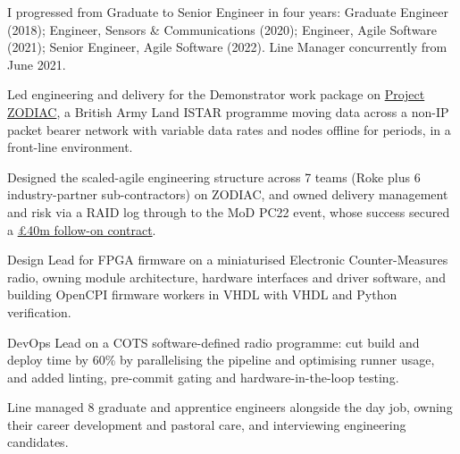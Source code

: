 I progressed from Graduate to Senior Engineer in four years: Graduate Engineer (2018); Engineer, Sensors \& Communications (2020); Engineer, Agile Software (2021); Senior Engineer, Agile Software (2022). \newline %
Line Manager concurrently from June 2021.
\vspace{0.25em}
\iftechnical%
\begin{tightemize}
  \item Led engineering and delivery for the Demonstrator work package on \href{https://www.roke.co.uk/project-zodiac/}{Project ZODIAC}, a British Army Land ISTAR programme moving data across a non-IP packet bearer network with variable data rates and nodes offline for periods, in a front-line environment.
  \item Designed the scaled-agile engineering structure across 7 teams (Roke plus 6 industry-partner sub-contractors) on ZODIAC, and owned delivery management and risk via a RAID log through to the MoD PC22 event, whose success secured a \href{https://www.linkedin.com/posts/roke-manor-research_roke-weareroke-activity-7108015849168347139-bJ8Z/}{\pounds{}40m follow-on contract}. %
  \item Design Lead for FPGA firmware on a miniaturised Electronic Counter-Measures radio, owning module architecture, hardware interfaces and driver software, and building OpenCPI firmware workers in VHDL with VHDL and Python verification.
  \item DevOps Lead on a COTS software-defined radio programme: cut build and deploy time by 60\% by parallelising the pipeline and optimising runner usage, and added linting, pre-commit gating and hardware-in-the-loop testing.
  \item Line managed 8 graduate and apprentice engineers alongside the day job, owning their career development and pastoral care, and interviewing engineering candidates.
\end{tightemize}
